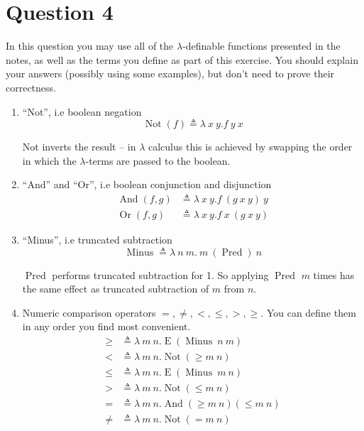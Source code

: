 \documentclass[10pt,\jkfside,a4paper]{article}
\begin{document}
\section{Question 4}

In this question you may use all of the $\lambda$-definable functions
presented in the notes, as well as the terms you define as part of this 
exercise. You should explain your answers (possibly using some examples), 
but don't need to prove their correctness.\\

\begin{enumerate}[label=(\alph*)]

\item ``Not'', i.e boolean negation
\[
\mathop{Not}(f) \triangleq \lambda\ x\ y. f\ y\ x
\]

Not inverts the result -- in $\lambda$ calculus this is achieved by swapping
the order in which the $\lambda$-terms are passed to the boolean.

\item ``And'' and ``Or'', i.e boolean conjunction and disjunction
\begin{align*}
\mathop{And}(f, g) &\triangleq \lambda\ x\ y. f\ (g\ x\ y)\ y \\
\mathop{Or}(f, g) &\triangleq \lambda\ x\ y. f\ x\ (g\ x\ y)
\end{align*}

\item ``Minus'', i.e truncated subtraction
\[
\mathop{Minus} \triangleq \lambda\ n\ m.\ m\ (\mathop{Pred})\ n
\]

$\mathop{Pred}$ performs truncated subtraction for 1. So applying
$\mathop{Pred}$ $m$ times has the same effect as truncated subtraction of
$m$ from $n$.

\item Numeric comparison operators $=, \neq, <, \leq , >, \geq$. You can
define them in any order you find most convenient.
\begin{align*}
\geq &\triangleq \lambda\ m\ n. \mathop{Eq_0} (\mathop{Minus}\ n\ m) \\
< &\triangleq \lambda\ m\ n. \mathop{Not}(\geq m\ n)\\
\leq &\triangleq \lambda\ m\ n. \mathop{Eq_0} (\mathop{Minus}\ m\ n) \\
> &\triangleq \lambda\ m\ n. \mathop{Not}(\leq m\ n)\\
= &\triangleq \lambda\ m\ n. \mathop{And} (\geq m\ n) (\leq m\ n) \\
\neq &\triangleq \lambda\ m\ n. \mathop{Not} (= m\ n) \\
\end{align*}


\end{enumerate}
\end{document}
